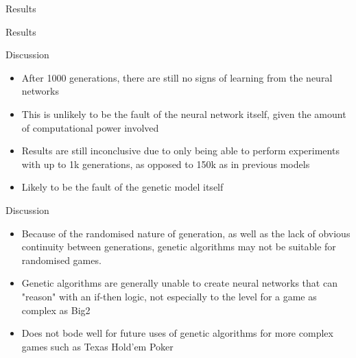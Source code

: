 \documentclass{beamer}
\begin{document}
\begin{frame}{Results}
\end{frame}

\begin{frame}{Results}
\end{frame}	

\begin{frame}{Discussion}
	\begin{itemize}
		\item After 1000 generations, there are still no signs of learning from the neural networks
		\item This is unlikely to be the fault of the neural network itself, given the amount of computational power involved
		\item Results are still inconclusive due to only being able to perform experiments with up to 1k generations, as opposed to 150k as in previous models
		\item Likely to be the fault of the genetic model itself
	\end{itemize}
\end{frame}

\begin{frame}{Discussion}
	\begin{itemize}
		\item Because of the randomised nature of generation, as well as the lack of obvious continuity between generations, genetic algorithms may not be suitable for randomised games.
		\item Genetic algorithms are generally unable to create neural networks that can "reason" with an if-then logic, not especially to the level for a game as complex as Big2
		\item Does not bode well for future uses of genetic algorithms for more complex games such as Texas Hold'em Poker
	\end{itemize}
\end{frame}
\end{document}
